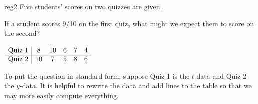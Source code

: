 \begin{example}{}{reg2}
Five students' scores on two quizzes are given.\par
\begin{minipage}[t]{0.69\linewidth}\vspace{-8pt}
If a student scores 9/10 on the first quiz, what might we expect them to score on the second?
\end{minipage}\hfill\begin{minipage}[t]{0.3\linewidth}\vspace{-20pt}
\flushright$\begin{array}[t]{c|ccccc}
\text{Quiz 1}&8&10&6&7&4\\\hline
\text{Quiz 2}&10&7&5&8&6
\end{array}$
\end{minipage}\medbreak

To put the question in standard form, suppose Quiz 1 is the $t$-data and Quiz 2 the $y$-data. It is helpful to rewrite the data and add lines to the table so that we may more easily compute everything.\par





\end{example}
